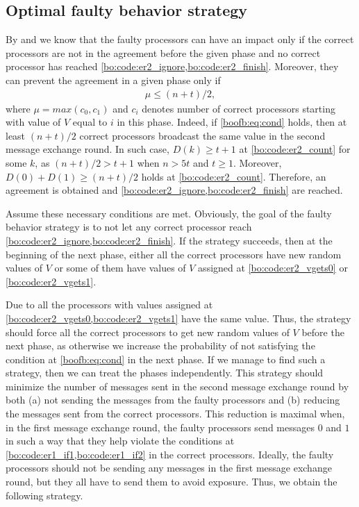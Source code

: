 \subsection{Optimal faulty behavior strategy}
By  and  we know that the faulty processors can have an impact only if the correct processors are not in the agreement before the given phase and no correct processor has reached \cref{bo:code:er2_ignore,bo:code:er2_finish}. Moreover, they can prevent the agreement in a given phase only if
\begin{align}
    \mu \leq (n+t)/2, \label{boofb:eq:cond}
\end{align}
where $\mu=max(c_0, c_1)$ and $c_i$ denotes number of correct processors starting with value of $V$ equal to $i$ in this phase. Indeed, if \cref{boofb:eq:cond} holds, then at least $(n+t)/2$ correct processors broadcast the same value in the second message exchange round. In such case, $D(k)\geq t+1$ at \cref{bo:code:er2_count} for some $k$, as $(n+t)/2 > t+1$ when $n>5t$ and $t\geq 1$. Moreover, $D(0)+D(1)\geq (n+t)/2$ holds at \cref{bo:code:er2_count}. Therefore, an agreement is obtained and \cref{bo:code:er2_ignore,bo:code:er2_finish} are reached.

Assume these necessary conditions are met. Obviously, the goal of the faulty behavior strategy is to not let any correct processor reach \cref{bo:code:er2_ignore,bo:code:er2_finish}. If the strategy succeeds, then at the beginning of the next phase, either all the correct processors have new random values of $V$ or some of them have values of $V$ assigned at \cref{bo:code:er2_vgets0} or \cref{bo:code:er2_vgets1}.

Due to  all the processors with values assigned at \cref{bo:code:er2_vgets0,bo:code:er2_vgets1} have the same value.
Thus, the strategy should force all the correct processors to get new random values of $V$ before the next phase, as otherwise we increase the probability of not satisfying the condition at \cref{boofb:eq:cond} in the next phase. If we manage to find such a strategy, then we can treat the phases independently.
This strategy should minimize the number of messages sent in the second message exchange round by both (a) not sending the messages from the faulty processors and (b) reducing the messages sent from the correct processors. This reduction is maximal when, in the first message exchange round, the faulty processors send messages $0$ and $1$ in such a way that they help violate the conditions at \cref{bo:code:er1_if1,bo:code:er1_if2} in the correct processors. Ideally, the faulty processors should not be sending any messages in the first message exchange round, but they all have to send them to avoid exposure. Thus, we obtain the following strategy.

